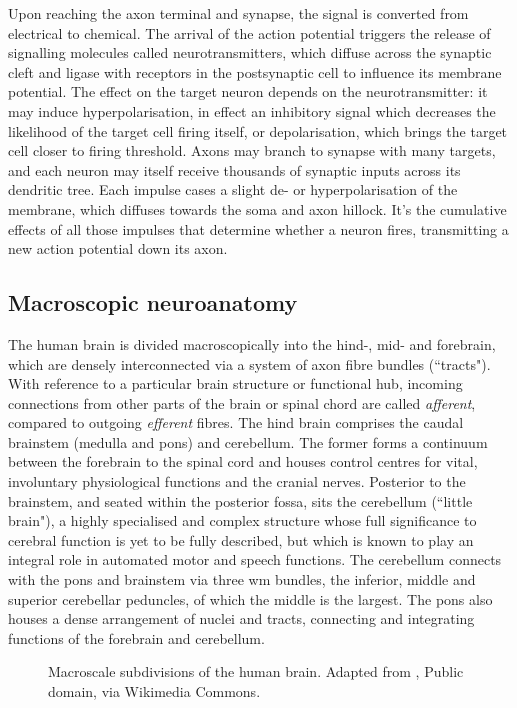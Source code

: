 Upon reaching the axon terminal and synapse, the signal is converted from electrical to chemical.
The arrival of the action potential triggers the release of signalling molecules called neurotransmitters, which diffuse across the synaptic cleft and ligase with receptors in the postsynaptic cell to influence its membrane potential.
The effect on the target neuron depends on the neurotransmitter: it may induce hyperpolarisation, in effect an inhibitory signal which decreases the likelihood of the target cell firing itself, or depolarisation, which brings the target cell closer to firing threshold.
Axons may branch to synapse with many targets, and each neuron may itself receive thousands of synaptic inputs across its dendritic tree.
Each impulse cases a slight de- or hyperpolarisation of the membrane, which diffuses towards the soma and axon hillock.
It's the cumulative effects of all those impulses that determine whether a neuron fires, transmitting a new action potential down its axon.

\subsection{Macroscopic neuroanatomy}

The human brain is divided macroscopically into the hind-, mid- and forebrain, which are densely interconnected via a system of axon fibre bundles (``tracts").
With reference to a particular brain structure or functional hub, incoming connections from other parts of the brain or spinal chord are called \textit{afferent}, compared to outgoing \textit{efferent} fibres.
The hind brain comprises the caudal brainstem (medulla and pons) and cerebellum.
The former forms a continuum between the forebrain to the spinal cord and houses control centres for vital, involuntary physiological functions and the cranial nerves.
Posterior to the brainstem, and seated within the posterior fossa, sits the cerebellum (``little brain"),
a highly specialised and complex structure whose full significance to cerebral function is yet to be fully described, but which is known to play an integral role in automated motor and speech functions.
The cerebellum connects with the pons and brainstem via three \gls{wm} bundles, the inferior, middle and superior cerebellar peduncles, of which the middle is the largest.
The pons also houses a dense arrangement of nuclei and tracts, connecting and integrating functions of the forebrain and cerebellum.

\begin{SCfigure}[][h!]
  
  \caption{Macroscale subdivisions of the human brain. Adapted from \textcite{Carter1918}, Public domain, via Wikimedia Commons.}
  \label{fig:anat1}
\end{SCfigure}


